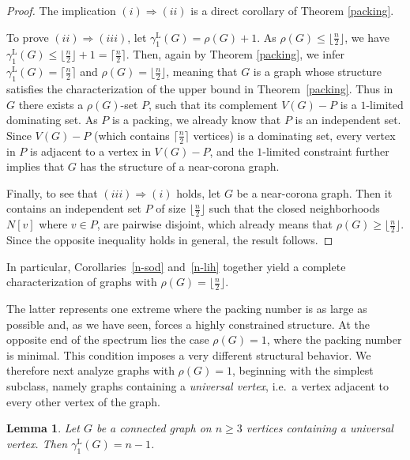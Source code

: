 \documentclass[11pt]{article}
\newtheorem{lemma}[theorem]{Lemma}
\newcommand{\gammaenaL}{\gamma_1^{\mathrm L}}
\begin{document}
\begin{proof}
The implication $(i)\Rightarrow (ii)$ is a direct corollary of Theorem \ref{packing}. 

To prove $(ii)\Rightarrow (iii)$, let $\gammaenaL(G)=\rho(G)+1$. As $\rho(G)\leq \lfloor\frac n2 \rfloor$, we have $\gammaenaL(G)\leq \lfloor\frac n2 \rfloor +1 = \lceil\frac n2 \rceil$. Then, again  by Theorem \ref{packing}, we infer 
$\gammaenaL(G)=\lceil\frac n2 \rceil$ and $\rho(G)=\lfloor\frac n2 \rfloor$, meaning that $G$ is a graph whose structure satisfies the characterization of the upper bound in Theorem~\ref{packing}. Thus in $G$ there exists a $\rho(G)$-set $P$, such that its complement $V(G)-P$ is a $1$-limited dominating set. As $P$ is a packing, we already know that $P$ is an independent set. Since $V(G)-P$ (which contains $\lceil \frac n2 \rceil$ vertices) is a dominating set, every vertex in $P$ is adjacent to a vertex in 
$V(G)-P$, and the $1$-limited constraint further implies
that $G$ has the structure of a near-corona graph.

Finally, to see that $(iii)\Rightarrow (i)$ holds, let $G$ be a near-corona graph. 
Then it contains an independent set 
$P$ of size $\lfloor\frac n2 \rfloor$ such that the closed neighborhoods $N[v]$ where 
$v \in P$, are pairwise disjoint, which already means that $\rho(G)\geq \lfloor \frac n2 \rfloor$.
Since the opposite inequality holds in general, the result follows.
\end{proof}

In particular, Corollaries~\ref{n-sod} and~\ref{n-lih} together yield a complete characterization of graphs with $\rho(G)=\lfloor\frac n2 \rfloor$.

The latter represents one extreme where the packing number is as large as possible and, as we have seen, forces a highly constrained structure.  
At the opposite end of the spectrum lies the case $\rho(G)=1$, where the packing number is minimal. This condition imposes 
a very different structural behavior.  
We therefore next analyze graphs with $\rho(G)=1$, beginning with the simplest
subclass, namely graphs containing a \emph{universal vertex}, i.e.~a vertex adjacent to every other vertex of the graph.


\begin{lemma}\label{k=1:universal}
Let $G$ be a connected graph on $n\geq 3$ vertices containing a universal vertex. Then $\gammaenaL(G)=n-1$.  
\end{lemma}
\end{document}
